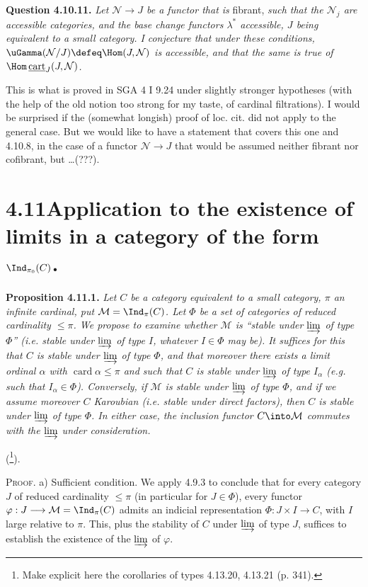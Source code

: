 \textbf{Question 4.10.11.} \textit{Let $\mathcal{N} \longrightarrow J$ be a functor that is} fibrant, \textit{such that the $\mathcal{N}_j$ are accessible categories, and the base change functors $\lambda^*$ accessible, $J$ being equivalent to a small category. I}  \textit{conjecture that under these conditions, $\uGamma(\mathcal{N}/J) \defeq \Hom(J,\mathcal{N})$ is accessible, and that the same is true of $\Hom\,\underline{\operatorname{cart}}_J(J,\mathcal{N})$.}

This is what is proved in SGA 4 I 9.24 under slightly stronger hypotheses (with the help of the old notion too strong for my taste, of cardinal filtrations). I would be surprised if the (somewhat longish) proof of loc. cit. did not apply to the general case. But we would like to have a statement that covers this one and 4.10.8, in the case of a functor $\mathcal{N} \longrightarrow J$ that would be assumed neither fibrant nor cofibrant, but \ldots(???).

\section*{4.11\quad Application to the existence of limits in a category of the form $\Ind_{\pi_0}(C)$.}

\textbf{Proposition 4.11.1.} \textit{Let}  \textit{$C$ be a category equivalent to a small category, $\pi$ an infinite cardinal, put $\mathcal{M} = \Ind_\pi(C)$. Let $\Phi$ be a set of categories of reduced cardinality $\leqslant \pi$. We propose to examine whether $\mathcal{M}$ is ``stable under $\varinjlim$ of type $\Phi$'' (i.e. stable under $\varinjlim$ of type $I$, whatever $I \in \Phi$ may be). It suffices for this that $C$ is stable under $\varinjlim$ of type $\Phi$, and that moreover there exists a limit ordinal $\alpha$ with $\operatorname{card}\alpha \leqslant \pi$ and such that $C$ is stable under $\varinjlim$ of type $I_\alpha$ (e.g. such that $I_\alpha \in \Phi$). Conversely, if $\mathcal{M}$ is stable under $\varinjlim$ of type $\Phi$, and if we assume moreover $C$ Karoubian (i.e. stable under direct factors), then $C$ is stable under $\varinjlim$ of type $\Phi$. In either case, the inclusion functor $C \into \mathcal{M}$ commutes with the $\varinjlim$ under consideration.}

(\footnote{Make explicit here the corollaries of types 4.13.20, 4.13.21 (p. 341).}).

\textsc{Proof}. a) Sufficient condition. We apply 4.9.3 to conclude that
for every category $J$ of reduced cardinality $\leqslant \pi$ (in particular for $J \in \Phi$), every functor $\varphi : J \longrightarrow \mathcal{M} = \Ind_\pi(C)$ admits an indicial representation $\Phi : J \times I \longrightarrow C$, with $I$ large relative to $\pi$. This, plus the stability of $C$ under $\varinjlim$ of type $J$, suffices to establish the existence of the $\varinjlim$ of $\varphi$.


